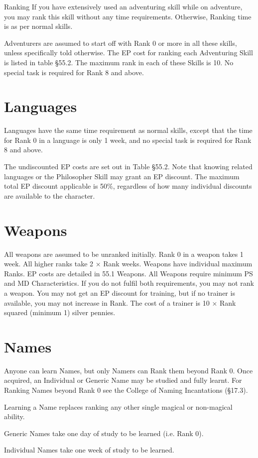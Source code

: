 \begin{Chapter}{Ranking}
If you have extensively used an adventuring skill while on adventure,
you may rank this skill without any time requirements. Otherwise,
Ranking time is as per normal skills.

Adventurers are assumed to start off with Rank 0 or more in all these
skills, unless specifically told otherwise. The EP cost for ranking
each Adventuring Skill is listed in table §55.2.  The maximum rank in
each of these Skills is 10. No special task is required for Rank 8 and
above.

\section{Languages}

Languages have the same time requirement as normal skills, except that
the time for Rank 0 in a language is only 1 week, and no special task
is required for Rank 8 and above.

The undiscounted EP costs are set out in Table §55.2.  Note that
knowing related languages or the Philosopher Skill may grant an EP
discount.  The maximum total EP discount applicable is 50\%,
regardless of how many individual discounts are available to the
character.

\section{Weapons}

All weapons are assumed to be unranked initially.  Rank 0 in a weapon
takes 1 week. All higher ranks take 2 × Rank weeks.  Weapons have
individual maximum Ranks.  EP costs are detailed in 55.1 Weapons.  All
Weapons require minimum PS and MD Characteristics.  If you do not
fulfil both requirements, you may not rank a weapon. You may not get
an EP discount for training, but if no trainer is available, you may
not increase in Rank.  The cost of a trainer is 10 × Rank squared
(minimum 1) silver pennies.

\section{Names}

Anyone can learn Names, but only Namers can Rank them beyond Rank 0.
Once acquired, an Individual or Generic Name may be studied and fully
learnt.  For Ranking Names beyond Rank 0 see the College of Naming
Incantations (§17.3).

\begin{Itemize}
  
\item Learning a Name replaces ranking any other single magical or
  non-magical ability.

\item Generic Names take one day of study to be learned (i.e. Rank 0).

\item Individual Names take one week of study to be learned.

\end{Itemize}

\end{Chapter}
